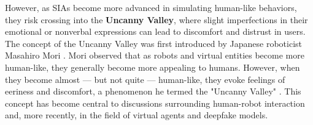 \documentclass[12pt]{article}
\begin{document}




However, as SIAs become more advanced in simulating human-like behaviors, they risk crossing into the {\bf Uncanny Valley}, where slight imperfections in their emotional or nonverbal expressions can lead to discomfort and distrust in users. The concept of the Uncanny Valley was first introduced by Japanese roboticist Masahiro Mori \cite{Mori2012TheValley}. Mori observed that as robots and virtual entities become more human-like, they generally become more appealing to humans. However, when they become almost — but not quite — human-like, they evoke feelings of eeriness and discomfort, a phenomenon he termed the "Uncanny Valley" \cite{Mori2012TheValley}. This concept has become central to discussions surrounding human-robot interaction and, more recently, in the field of virtual agents and deepfake models.
\end{document}
